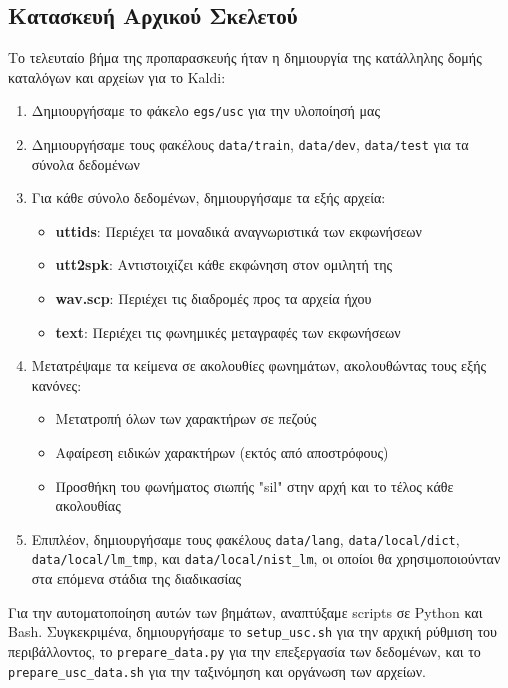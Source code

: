 \documentclass[a4paper,12pt]{article}
\begin{document}
\subsection{Κατασκευή Αρχικού Σκελετού}

Το τελευταίο βήμα της προπαρασκευής ήταν η δημιουργία της κατάλληλης δομής καταλόγων και αρχείων για το Kaldi:

\begin{enumerate}
    \item Δημιουργήσαμε το φάκελο \verb|egs/usc| για την υλοποίησή μας
    
    \item Δημιουργήσαμε τους φακέλους \verb|data/train|, \verb|data/dev|, \verb|data/test| για τα σύνολα δεδομένων
    
    \item Για κάθε σύνολο δεδομένων, δημιουργήσαμε τα εξής αρχεία:
    \begin{itemize}
        \item \textbf{uttids}: Περιέχει τα μοναδικά αναγνωριστικά των εκφωνήσεων
        \item \textbf{utt2spk}: Αντιστοιχίζει κάθε εκφώνηση στον ομιλητή της
        \item \textbf{wav.scp}: Περιέχει τις διαδρομές προς τα αρχεία ήχου
        \item \textbf{text}: Περιέχει τις φωνημικές μεταγραφές των εκφωνήσεων
    \end{itemize}
    
    \item Μετατρέψαμε τα κείμενα σε ακολουθίες φωνημάτων, ακολουθώντας τους εξής κανόνες:
    \begin{itemize}
        \item Μετατροπή όλων των χαρακτήρων σε πεζούς
        \item Αφαίρεση ειδικών χαρακτήρων (εκτός από αποστρόφους)
        \item Προσθήκη του φωνήματος σιωπής "sil" στην αρχή και το τέλος κάθε ακολουθίας
    \end{itemize}
    
    \item Επιπλέον, δημιουργήσαμε τους φακέλους \verb|data/lang|, \verb|data/local/dict|, \verb|data/local/lm_tmp|, και \verb|data/local/nist_lm|, οι οποίοι θα χρησιμοποιούνταν στα επόμενα στάδια της διαδικασίας
\end{enumerate}

Για την αυτοματοποίηση αυτών των βημάτων, αναπτύξαμε scripts σε Python και Bash. Συγκεκριμένα, δημιουργήσαμε το \verb|setup_usc.sh| για την αρχική ρύθμιση του περιβάλλοντος, το \verb|prepare_data.py| για την επεξεργασία των δεδομένων, και το \verb|prepare_usc_data.sh| για την ταξινόμηση και οργάνωση των αρχείων.
\end{document}
